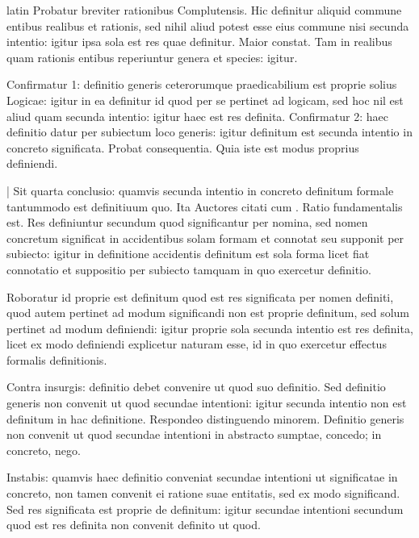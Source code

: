 \begin{otherlanguage*}{latin}
\pstart
  Probatur breviter rationibus Complutensis. Hic definitur aliquid commune entibus realibus et rationis, sed nihil aliud potest esse eius commune nisi secunda intentio: igitur ipsa sola est res quae definitur. Maior constat. Tam in realibus quam rationis entibus reperiuntur genera et species: igitur. 
\pend

\pstart
  Confirmatur 1: definitio generis ceterorumque praedicabilium est proprie solius Logicae: igitur in ea definitur id quod per se pertinet ad logicam, sed hoc nil est aliud quam secunda intentio: igitur haec est res definita. Confirmatur 2: haec definitio datur per subiectum loco generis: igitur definitum est secunda intentio in concreto significata. Probat consequentia. Quia iste est modus proprius definiendi. 
\pend

\pstart
  \textnormal{|} Sit quarta conclusio: quamvis secunda intentio in concreto definitum formale tantummodo est definitiuum quo. Ita Auctores citati cum . Ratio fundamentalis est. Res definiuntur secundum quod significantur per nomina, sed nomen concretum significat in accidentibus solam formam et connotat seu supponit per subiecto: igitur in definitione accidentis definitum est sola forma licet fiat connotatio et suppositio per subiecto tamquam in quo exercetur definitio. 
\pend

\pstart
  Roboratur id proprie est definitum quod est res significata per nomen definiti, quod autem pertinet ad modum significandi non est proprie definitum, sed solum pertinet ad modum definiendi: igitur proprie sola secunda intentio est res definita, licet ex modo definiendi explicetur naturam esse, id in quo exercetur effectus formalis definitionis. 
\pend

\pstart
  Contra insurgis: definitio debet convenire ut quod suo definitio. Sed definitio generis non convenit ut quod secundae intentioni: igitur secunda intentio non est definitum in hac definitione. Respondeo distinguendo minorem. Definitio generis non convenit ut quod secundae intentioni in abstracto sumptae, concedo; in concreto, nego. 
\pend

\pstart
  Instabis: quamvis haec definitio conveniat secundae intentioni ut significatae in concreto, non tamen convenit ei ratione suae entitatis, sed ex modo significand. Sed res significata est proprie de definitum: igitur secundae intentioni secundum quod est res definita non convenit definito ut quod. 
\pend


\end{otherlanguage*}

